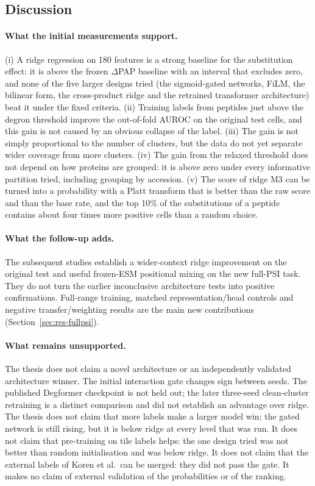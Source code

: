 \subsection{Discussion}
\paragraph{What the initial measurements support.} (i) A ridge regression on 180 features is a strong baseline for the
substitution effect: it is above the frozen $\Delta$PAP baseline with an interval that excludes zero, and none of the
five larger designs tried (the sigmoid-gated networks, FiLM, the bilinear form, the cross-product ridge and the retrained
transformer architecture) beat it under the fixed criteria. (ii) Training labels from peptides just above the
degron threshold improve the out-of-fold AUROC on the original test cells, and this gain is not caused by an obvious
collapse of the label. (iii) The gain is not simply proportional to the number of clusters, but the data do not
yet separate wider coverage from more clusters. (iv) The gain from the relaxed threshold does not depend on how proteins
are grouped: it is above zero under every informative partition tried, including grouping by accession. (v) The score of ridge M3 can be turned into a probability with a
Platt transform that is better than the raw score and than the base rate, and the top 10\% of the substitutions of a peptide contains about four times
more positive cells than a random choice.

\paragraph{What the follow-up adds.} The subsequent studies establish a wider-context ridge improvement
on the original test and useful frozen-ESM positional mixing on the new full-PSI task. They do not
turn the earlier inconclusive architecture tests into positive confirmations. Full-range training,
matched representation/head controls and negative transfer/weighting results are the main new
contributions (Section~\ref{sec:res-fullpsi}).

\paragraph{What remains unsupported.} The thesis does not claim a novel architecture or an independently
validated architecture winner. The initial interaction gate changes sign between seeds. The published
Degformer checkpoint is not held out; the later three-seed clean-cluster retraining is a distinct
comparison and did not establish an advantage over ridge. The thesis does not claim that more labels make a larger model win; the gated network is
still rising, but it is below ridge at every level that was run. It does not claim that pre-training on tile labels helps: the one design tried
was not better than random initialisation and was below ridge. It does not claim that the external labels of Koren et al.\ can be merged: they did not pass the gate. It
makes no claim of external validation of the probabilities or of the ranking.

